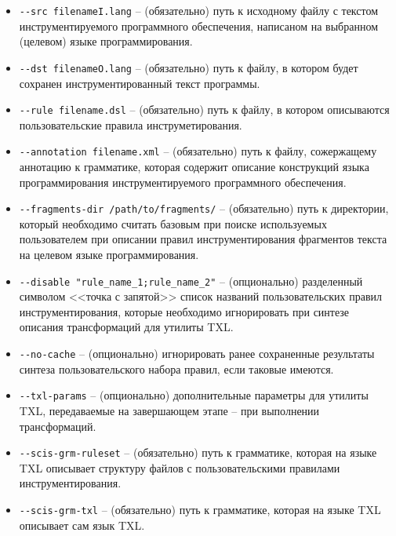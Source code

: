 \begin{itemize}[noitemsep]
  \item \lstinline{--src filenameI.lang}                -- (обязательно)
  путь к исходному файлу с текстом инструментируемого программного обеспечения, написаном на выбранном (целевом) языке программирования.

  \item \lstinline{--dst filenameO.lang}                -- (обязательно)
  путь к файлу, в котором будет сохранен инструментированный текст программы.

  \item \lstinline{--rule filename.dsl}                 -- (обязательно)
  путь к файлу, в котором описываются пользовательские правила инструметирования.

  \item \lstinline{--annotation filename.xml}           -- (обязательно)
  путь к файлу, сожержащему аннотацию к грамматике, которая содержит описание конструкций языка программирования инструментируемого программного обеспечения.

  \item \lstinline{--fragments-dir /path/to/fragments/} -- (обязательно)
  путь к директории, который необходимо считать базовым при поиске используемых пользователем при описании правил инструментирования фрагментов текста на целевом языке программирования.

  \item \lstinline{--disable "rule_name_1;rule_name_2"} -- (опционально)
  разделенный символом <<точка с запятой>> список названий пользовательских правил инструментирования, которые необходимо игнорировать при синтезе описания трансформаций для утилиты TXL.

  \item \lstinline{--no-cache}         -- (опционально)
  игнорировать ранее сохраненные результаты синтеза пользовательского набора правил, если таковые имеются.

  \item \lstinline{--txl-params}       -- (опционально)
  дополнительные параметры для утилиты TXL, передаваемые на завершающем этапе -- при выполнении трансформаций.

  \item \lstinline{--scis-grm-ruleset} -- (обязательно)
  путь к грамматике, которая на языке TXL описывает структуру файлов с пользовательскими правилами инструментирования.
  \item \lstinline{--scis-grm-txl}     -- (обязательно)
  путь к грамматике, которая на языке TXL описывает сам язык TXL.
\end{itemize}

